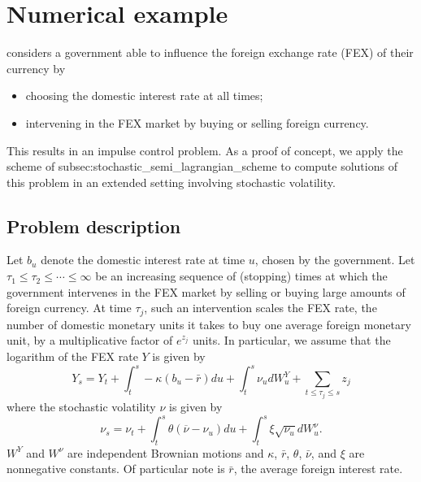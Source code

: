 \documentclass[12pt]{article}
\begin{document}
\section{\label{sec:numerical_example}Numerical example}

\cite{MR1614233} considers a government able to influence the foreign
exchange rate (FEX) of their currency by
\begin{itemize}
\item choosing the domestic interest rate at all times;
\item intervening in the FEX market by buying or selling
foreign currency.
\end{itemize}
This results in an impulse control problem. As a proof of concept,
we apply the scheme of {\prettyref}{subsec:stochastic_semi_lagrangian_scheme}
to compute solutions of this problem in an extended setting involving
stochastic volatility.

\subsection{Problem description}

Let $b_{u}$ denote the domestic interest rate at time $u$, chosen
by the government. Let $\tau_{1}{\leqslant}\tau_{2}{\leqslant}\cdots{\leqslant}\infty$
be an increasing sequence of (stopping) times at which the government
intervenes in the FEX market by selling or buying large amounts of
foreign currency. At time $\tau_{j}$, such an intervention scales
the FEX rate, the number of domestic monetary units it takes to buy
one average foreign monetary unit, by a multiplicative factor of $e^{z_{j}}$
units. In particular, we assume that the logarithm of the FEX rate
$Y$ is given by
\[
Y_{s}=Y_{t}+\int_{t}^{s}-\kappa(b_{u}-\bar{r})du+\int_{t}^{s}\nu_{u}dW_{u}^{Y}+\sum_{t{\leqslant}\tau_{j}{\leqslant} s}z_{j}
\]
where the stochastic volatility $\nu$ is given by
\[
\nu_{s}=\nu_{t}+\int_{t}^{s}\theta\left(\overline{\nu}-\nu_{u}\right)du+\int_{t}^{s}\xi\sqrt{\nu_{u}}dW_{u}^{\nu}.
\]
$W^{Y}$ and $W^{\nu}$ are independent Brownian motions and $\kappa$,
$\bar{r}$, $\theta$, $\bar{\nu}$, and $\xi$ are nonnegative constants.
Of particular note is $\bar{r}$, the average foreign interest rate.
\end{document}
